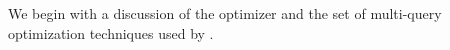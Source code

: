 


We begin with a discussion of the optimizer and the set of multi-query optimization 
techniques used by \SeeDB.



